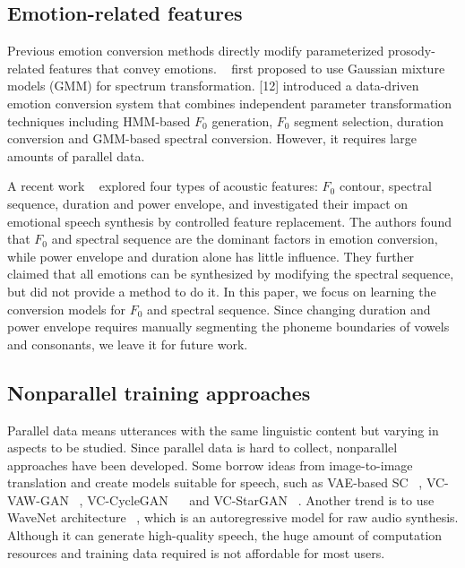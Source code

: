 \documentclass{article}
\begin{document}
\subsection{Emotion-related features}
Previous emotion conversion methods directly modify parameterized prosody-related features that convey emotions. ~\cite{kawanami2003gmm} first proposed to use Gaussian mixture models (GMM) for spectrum transformation. [12] introduced a data-driven emotion conversion system that combines independent parameter transformation techniques including HMM-based $F_0$ generation, $F_0$ segment selection, duration conversion and GMM-based spectral conversion. However, it requires large amounts of parallel data.

A recent work ~\cite{xue2018voice} explored four types of acoustic features: $F_0$ contour, spectral sequence, duration and power envelope, and investigated their impact on emotional speech synthesis by controlled feature replacement. The authors found that $F_0$ and spectral sequence are the dominant factors in emotion conversion, while power envelope and duration alone has little influence. They further claimed that all emotions can be synthesized by modifying the spectral sequence, but did not provide a method to do it. In this paper, we focus on learning the conversion models for $F_0$ and spectral sequence. Since changing duration and power envelope requires manually segmenting the phoneme boundaries of vowels and consonants, we leave it for future work.

\subsection{Nonparallel training approaches}
Parallel data means utterances with the same linguistic content but varying in aspects to be studied. Since parallel data is hard to collect, nonparallel approaches have been developed. Some borrow ideas from image-to-image translation and create models suitable for speech, such as VAE-based SC ~\cite{hsu2016voice}, VC-VAW-GAN ~\cite{hsu2017voice}, VC-CycleGAN ~\cite{fang2018high}~\cite{kaneko2017parallel} and VC-StarGAN ~\cite{kameoka2018stargan}. Another trend is to use WaveNet architecture ~\cite{van2016wavenet}, which is an autoregressive model for raw audio synthesis. Although it can generate high-quality speech, the huge amount of computation resources and training data required is not affordable for most users.
\end{document}
